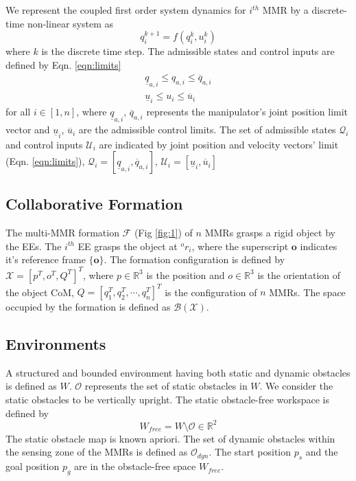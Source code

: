 We represent the coupled first order system dynamics for $i^{th}$ MMR  by a discrete-time non-linear system as
\begin{equation}\label{stf}
	q^{k+1}_i =f(q^k_i ,u^k_i)
\end{equation}
where $k$ is the discrete time step. The admissible states and control inputs are defined by Eqn. \ref{eqn:limits}
\begin{subequations}
	\begin{align}
		\underline{q}_{a,i}\leq q_{a,i}\leq\overline{q}_{a,i} \label{jsl}\\
		\underline{u}_{i}\leq u_{i}\leq\overline{u}_{i}
		\label{ajrl}
	\end{align}
	\label{eqn:limits}
\end{subequations}
for all $i \in [1,n]$, where $\underline{q}_{a,i}$, $\overline{q}_{a,i}$ represents the manipulator's joint position limit vector and $\underline{u}_{i}$, $\overline{u}_{i}$ are the admissible control limits. The set of admissible states $\mathcal{Q}_i$ and control inputs $\mathcal{U}_i$ are indicated by joint position and velocity vectors' limit (Eqn. \eqref{eqn:limits}), $\mathcal{Q}_i = [\underline{q}_{a,i}, \overline{q}_{a,i}]$, $\mathcal{U}_i = [\underline{u}_{i}, \overline{u}_{i}]$

\subsection{Collaborative Formation}
The multi-MMR formation $\mathcal{F}$ (Fig \ref{fig:1}) of $n$ MMRs grasps a rigid object by the EEs. The $i^{th}$ EE grasps the object at $^or_i$, where the superscript $\boldsymbol{o}$ indicates it's reference frame $\{\boldsymbol{o}\}$. The formation configuration is defined by $\mathcal{X}=[p^T,o^T,Q^T]^T$, where $p\in\mathbb{R}^3$ is the position and $o\in\mathbb{R}^3$ is the orientation of the object CoM, $Q=[q_1^T,q_2^T,\cdots, q_n^T]^T$ is the configuration of $n$ MMRs. The space occupied by the formation is defined as $\mathcal{B}(\mathcal{X})$.

\subsection{Environments}
A structured and bounded environment having both static and dynamic obstacles is defined as $W$. $\mathcal{O}$ represents the set of static obstacles in $W$. We consider the static obstacles to be vertically upright. The static obstacle-free workspace is defined by 
\begin{equation}\label{eqn11}
    W_{free} = W\setminus\mathcal{O}\in\mathbb{R}^2
\end{equation}
The static obstacle map is known apriori. The set of dynamic obstacles within the sensing zone of the MMRs is defined as $\mathcal{O}_{dyn}$. The start position $p_s$ and the goal position $p_g$ are in the obstacle-free space $W_{free}$.

